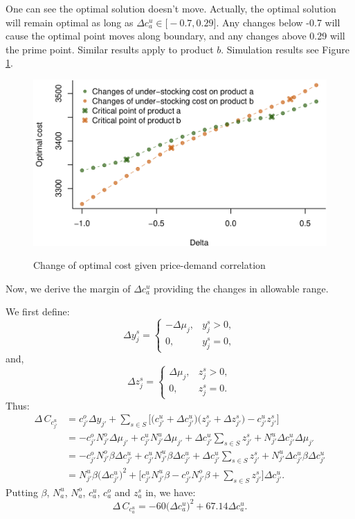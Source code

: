 \documentclass[a4paper,11pt]{article}
\begin{document}
One can see the optimal solution doesn't move. Actually, the optimal solution will remain optimal as long as $\Delta c_a^u \in \big[ -0.7,0.29 \big]$. Any changes below -0.7 will cause the optimal point moves along boundary, and any changes above 0.29 will  the prime point. Similar results apply to product $b$. Simulation results see Figure \ref{fig:demandunder}.

\begin{figure}[ht]
\centering
\caption{Change of optimal cost given price-demand correlation}
\includegraphics{Example-figure_files/figure-latex/demandunder-1.pdf}
\label{fig:demandunder}
\end{figure}

Now, we derive the margin of $\Delta c_a^u$ providing the changes in allowable range.

We first define:
\[
    \Delta y_j^s =
    \begin{cases}
        -\Delta \mu_j, & y_j^s > 0,\\
        0, & y_j^s = 0,
    \end{cases}
\]
and,
\[
    \Delta z_j^s =
    \begin{cases}
        \Delta \mu_j, & z_j^s > 0,\\
        0, & z_j^s = 0.
    \end{cases}
\]
Thus:
\[
\begin{aligned}
    \Delta \, C_{c_{j'}^u}
    & = c_{j'}^o \Delta y_{j'} + \sum_{s \in S} \big[ \big( c_{j'}^u + \Delta c_{j'}^u \big) \big( z_{j'}^s + \Delta z_{j'}^s \big) - c_{j'}^u z_{j'}^s \big]\\
    & = -c_{j'}^o N_{j'}^o \Delta \mu_{j'} + c_{j'}^u 
    N_{j'}^u \Delta \mu_{j'} + \Delta c_{j'}^u \sum_{s \in S} z_{j'}^s + N_{j'}^u \Delta c_{j'}^u \Delta \mu_{j'}\\
    & = -c_{j'}^o N_{j'}^o \beta \Delta c_{j'}^u + c_{j'}^u N_{j'}^u \beta \Delta c_{j'}^u + \Delta c_{j'}^u \sum_{s \in S} z_{j'}^s + N_{j'}^u \Delta c_{j'}^u \beta \Delta c_{j'}^u\\
    & = N_{j'}^u \beta \big( \Delta c_{j'}^u \big)^2 + \big[ c_{j'}^u N_{j'}^u \beta - c_{j'}^o N_{j'}^o \beta + \sum_{s \in S} z_{j'}^s \big] \Delta c_{j'}^u.
\end{aligned}
\]
Putting $\beta$, $N_a^u$, $N_a^o$, $c_a^u$, $c_a^o$ and $z_a^s$ in, we have:
\[
    \Delta \, C_{c_a^u} = -60 \big( \Delta c_a^u \big)^2 + 67.14 \Delta c_a^u.
\]
\end{document}
